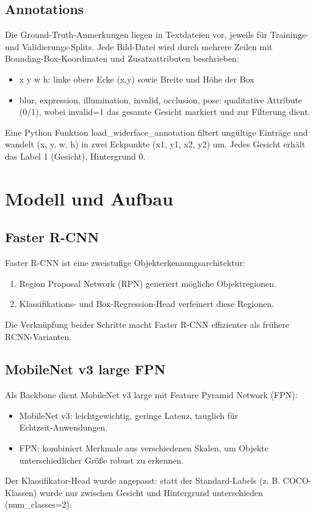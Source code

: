 \documentclass[11pt,a4paper]{article}
\begin{document}
\subsection{Annotations}
Die Ground-Truth-Anmerkungen liegen in Textdateien vor, jeweils für Trainings- und Validierungs-Splits. Jede Bild-Datei wird durch mehrere Zeilen mit Bounding-Box-Koordinaten und Zusatzattributen beschrieben:
\begin{itemize}
\item x y w h: linke obere Ecke (x,y) sowie Breite und Höhe der Box
\item blur, expression, illumination, invalid, occlusion, pose: qualitative Attribute (0/1), wobei invalid=1 das gesamte Gesicht markiert und zur Filterung dient.
\end{itemize}
Eine Python Funktion load\_widerface\_annotation filtert ungültige Einträge und wandelt (x, y, w, h) in zwei Eckpunkte (x1, y1, x2, y2) um. Jedes Gesicht erhält das Label 1 (Gesicht), Hintergrund 0.

\section{Modell und Aufbau}
\subsection{Faster R-CNN}
Faster R-CNN ist eine zweistufige Objekterkennungsarchitektur:
\begin{enumerate}
\item Region Proposal Network (RPN) generiert mögliche Objektregionen.
\item Klassifikations- und Box-Regression-Head verfeinert diese Regionen.
\end{enumerate}
Die Verknüpfung beider Schritte macht Faster R-CNN effizienter als frühere RCNN-Varianten.

\subsection{MobileNet v3 large FPN}
Als Backbone dient MobileNet v3 large mit Feature Pyramid Network (FPN):
\begin{itemize}
\item MobileNet v3: leichtgewichtig, geringe Latenz, tauglich für Echtzeit‑Anwendungen.
\item FPN: kombiniert Merkmale aus verschiedenen Skalen, um Objekte unterschiedlicher Größe robust zu erkennen.
\end{itemize}
Der Klassifikator-Head wurde angepasst: statt der Standard-Labels (z. B. COCO-Klassen) wurde nur zwischen Gesicht und Hintergrund unterschieden (num\_classes=2).
\end{document}

